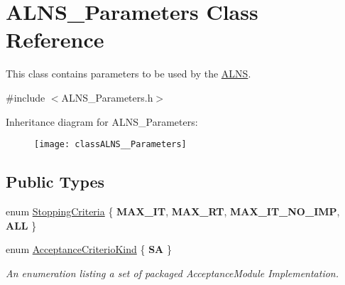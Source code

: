 \hypertarget{classALNS__Parameters}{\section{A\-L\-N\-S\-\_\-\-Parameters Class Reference}
\label{classALNS__Parameters}
}


This class contains parameters to be used by the \hyperlink{classALNS}{A\-L\-N\-S}.  




{\ttfamily \#include $<$A\-L\-N\-S\-\_\-\-Parameters.\-h$>$}

Inheritance diagram for A\-L\-N\-S\-\_\-\-Parameters\-:\begin{figure}[H]
\begin{center}
\leavevmode
\texttt{[image: classALNS\_\_Parameters]}
\end{center}
\end{figure}
\subsection*{Public Types}
\begin{DoxyCompactItemize}
\item 
enum \hyperlink{classALNS__Parameters_ae252d050b207dee5b442ca7d02c1d831}{Stopping\-Criteria} \{ {\bfseries M\-A\-X\-\_\-\-I\-T}, 
{\bfseries M\-A\-X\-\_\-\-R\-T}, 
{\bfseries M\-A\-X\-\_\-\-I\-T\-\_\-\-N\-O\-\_\-\-I\-M\-P}, 
{\bfseries A\-L\-L}
 \}
\item 
enum \hyperlink{classALNS__Parameters_addd5421947a7a1a533fec576f37560c7}{Acceptance\-Criterio\-Kind} \{ {\bfseries S\-A}
 \}
\begin{DoxyCompactList}\small\item\em An enumeration listing a set of packaged Acceptance\-Module Implementation. \end{DoxyCompactList}\end{DoxyCompactItemize}

